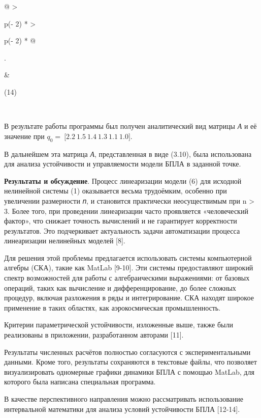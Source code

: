 \begin{longtable}{@{}
  >{\raggedright\arraybackslash}p{(\columnwidth - 2\tabcolsep) * }
  >{\raggedright\arraybackslash}p{(\columnwidth - 2\tabcolsep) * }@{}}
\begin{minipage}[b]{\linewidth}
\begin{pmatrix}
\begin{matrix}
\begin{matrix}
\begin{matrix}
\begin{matrix}
\end{matrix}
\end{matrix}
\end{matrix}
\end{matrix}
\end{pmatrix}\).
\end{minipage} & \begin{minipage}[b]{\linewidth}\raggedright
(14)
\end{minipage} \\

\end{longtable}


В результате работы программы был получен аналитический вид матрицы
\emph{А} и её значение при
\(q_{0} = \ \lbrack 2.2\ 1.5\ 1.4\ 1.3\ 1.1\ 1.0\rbrack\).

В дальнейшем эта матрица \emph{А}, представленная в виде (3.10), была
использована для анализа устойчивости и управляемости модели БПЛА в
заданной точке.

{\bfseries Результаты и обсуждение}. Процесс линеаризации модели (6) для
исходной нелинейной системы (1) оказывается весьма трудоёмким, особенно
при увеличении размерности 𝑛, и становится практически неосуществимым
при n \textgreater{} 3. Более того, при проведении линеаризации часто
проявляется «человеческий фактор», что снижает точность вычислений и не
гарантирует корректности результатов. Это подчеркивает актуальность
задачи автоматизации процесса линеаризации нелинейных моделей {[}8{]}.

Для решения этой проблемы предлагается использовать системы компьютерной
алгебры (СКА), такие как MatLab {[}9-10{]}. Эти системы предоставляют
широкий спектр возможностей для работы с алгебраическими выражениями: от
базовых операций, таких как вычисление и дифференцирование, до более
сложных процедур, включая разложения в ряды и интегрирование. СКА
находят широкое применение в таких областях, как аэрокосмическая
промышленность.

Критерии параметрической устойчивости, изложенные выше, также были
реализованы в приложении, разработанном авторами {[}11{]}.

Результаты численных расчётов полностью согласуются с экспериментальными
данными. Кроме того, результаты сохраняются в текстовые файлы, что
позволяет визуализировать одномерные графики динамики БПЛА с помощью
MatLab, для которого была написана специальная программа.

В качестве перспективного направления можно рассматривать использование
интервальной математики для анализа условий устойчивости БПЛА
{[}12-14{]}.

